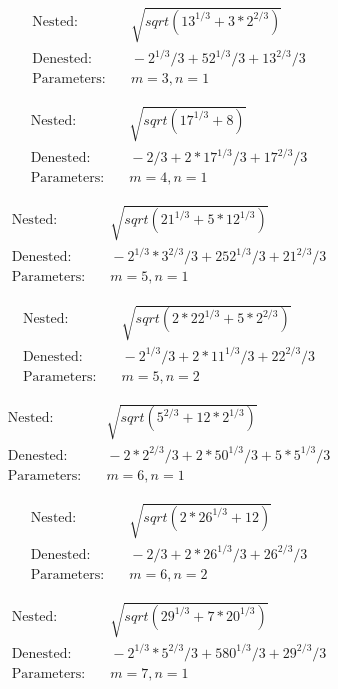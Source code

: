 
\begin{align*}
\text{Nested:} &\quad \sqrt{sqrt(13^{1/3} + 3*2^{2/3})} \\
\text{Denested:} &\quad -2^{1/3}/3 + 52^{1/3}/3 + 13^{2/3}/3 \\
\text{Parameters:} &\quad m=3, n=1
\end{align*}

\begin{align*}
\text{Nested:} &\quad \sqrt{sqrt(17^{1/3} + 8)} \\
\text{Denested:} &\quad -2/3 + 2*17^{1/3}/3 + 17^{2/3}/3 \\
\text{Parameters:} &\quad m=4, n=1
\end{align*}

\begin{align*}
\text{Nested:} &\quad \sqrt{sqrt(21^{1/3} + 5*12^{1/3})} \\
\text{Denested:} &\quad -2^{1/3}*3^{2/3}/3 + 252^{1/3}/3 + 21^{2/3}/3 \\
\text{Parameters:} &\quad m=5, n=1
\end{align*}

\begin{align*}
\text{Nested:} &\quad \sqrt{sqrt(2*22^{1/3} + 5*2^{2/3})} \\
\text{Denested:} &\quad -2^{1/3}/3 + 2*11^{1/3}/3 + 22^{2/3}/3 \\
\text{Parameters:} &\quad m=5, n=2
\end{align*}

\begin{align*}
\text{Nested:} &\quad \sqrt{sqrt(5^{2/3} + 12*2^{1/3})} \\
\text{Denested:} &\quad -2*2^{2/3}/3 + 2*50^{1/3}/3 + 5*5^{1/3}/3 \\
\text{Parameters:} &\quad m=6, n=1
\end{align*}

\begin{align*}
\text{Nested:} &\quad \sqrt{sqrt(2*26^{1/3} + 12)} \\
\text{Denested:} &\quad -2/3 + 2*26^{1/3}/3 + 26^{2/3}/3 \\
\text{Parameters:} &\quad m=6, n=2
\end{align*}

\begin{align*}
\text{Nested:} &\quad \sqrt{sqrt(29^{1/3} + 7*20^{1/3})} \\
\text{Denested:} &\quad -2^{1/3}*5^{2/3}/3 + 580^{1/3}/3 + 29^{2/3}/3 \\
\text{Parameters:} &\quad m=7, n=1
\end{align*}

